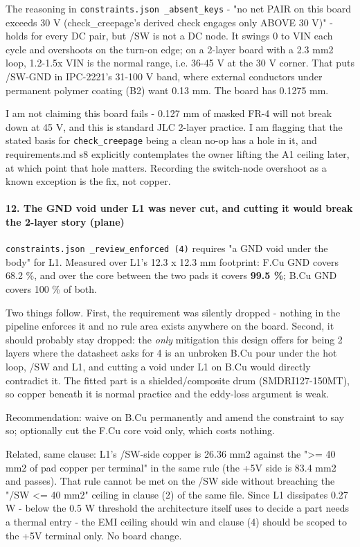 \documentclass[11pt,a4paper]{article}
\begin{document}
The reasoning in \texttt{constraints.json \_absent\_keys} - "no net PAIR on this board exceeds 30 V (check\_creepage's derived check engages only ABOVE 30 V)" - holds for every DC pair, but /SW is not a DC node. It swings 0 to VIN each cycle and overshoots on the turn-on edge; on a 2-layer board with a 2.3 mm2 loop, 1.2-1.5x VIN is the normal range, i.e. 36-45 V at the 30 V corner. That puts /SW-GND in IPC-2221's 31-100 V band, where external conductors under permanent polymer coating (B2) want 0.13 mm. The board has 0.1275 mm.

I am not claiming this board fails - 0.127 mm of masked FR-4 will not break down at 45 V, and this is standard JLC 2-layer practice. I am flagging that the stated basis for \texttt{check\_creepage} being a clean no-op has a hole in it, and requirements.md s8 explicitly contemplates the owner lifting the A1 ceiling later, at which point that hole matters. Recording the switch-node overshoot as a known exception is the fix, not copper.

\paragraph*{12. The GND void under L1 was never cut, and cutting it would break the 2-layer story (plane)}
\texttt{constraints.json \_review\_enforced (4)} requires "a GND void under the body" for L1. Measured over L1's 12.3 x 12.3 mm footprint: F.Cu GND covers 68.2 \%, and over the core between the two pads it covers \textbf{99.5 \%}; B.Cu GND covers 100 \% of both.

Two things follow. First, the requirement was silently dropped - nothing in the pipeline enforces it and no rule area exists anywhere on the board. Second, it should probably stay dropped: the \emph{only} mitigation this design offers for being 2 layers where the datasheet asks for 4 is an unbroken B.Cu pour under the hot loop, /SW and L1, and cutting a void under L1 on B.Cu would directly contradict it. The fitted part is a shielded/composite drum (SMDRI127-150MT), so copper beneath it is normal practice and the eddy-loss argument is weak.

Recommendation: waive on B.Cu permanently and amend the constraint to say so; optionally cut the F.Cu core void only, which costs nothing.

Related, same clause: L1's /SW-side copper is 26.36 mm2 against the "\textgreater{}= 40 mm2 of pad copper per terminal" in the same rule (the +5V side is 83.4 mm2 and passes). That rule cannot be met on the /SW side without breaching the "/SW \textless{}= 40 mm2" ceiling in clause (2) of the same file. Since L1 dissipates 0.27 W - below the 0.5 W threshold the architecture itself uses to decide a part needs a thermal entry - the EMI ceiling should win and clause (4) should be scoped to the +5V terminal only. No board change.
\end{document}
